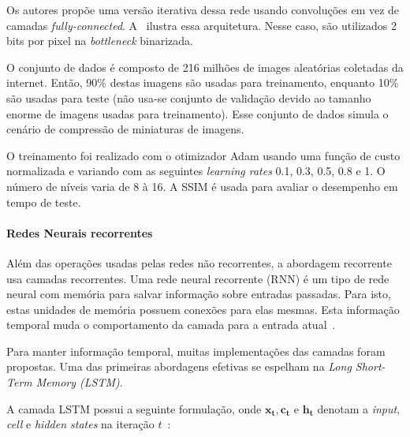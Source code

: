 Os autores propõe uma versão iterativa dessa rede usando convoluções em vez de camadas \textit{fully-connected}. A~ ilustra essa arquitetura. Nesse caso, são utilizados 2 bits por pixel na \textit{bottleneck} binarizada.


O conjunto de dados é composto de 216 milhões de images aleatórias coletadas da internet. Então, 90\% destas imagens são usadas para treinamento, enquanto 10\% são usadas para teste (não usa-se conjunto de validação devido ao tamanho enorme de imagens usadas para treinamento). Esse conjunto de dados simula o cenário de compressão de miniaturas de imagens.

O treinamento foi realizado com o otimizador Adam usando uma função de custo normalizada e variando com as seguintes \textit{learning rates} 0.1, 0.3, 0.5, 0.8 e 1. O número de níveis varia de 8 à 16. A \acrshort{SSIM} é usada para avaliar o desempenho em tempo de teste. 

\paragraph{Redes Neurais recorrentes\\}
Além das operações usadas pelas redes não recorrentes, a abordagem recorrente usa camadas recorrentes. Uma rede neural recorrente (\acrshort{RNN}) é um tipo de rede neural com memória para salvar informação sobre entradas passadas. Para isto, estas unidades de memória possuem conexões para elas mesmas. Esta informação temporal muda o comportamento da camada para a entrada atual~\cite{Survey_CSVT2019}.

Para manter informação temporal, muitas implementações das camadas foram propostas. Uma das primeiras abordagens efetivas se espelham na \textit{Long Short-Term Memory (\acrshort{LSTM})}.

A camada \acrshort{LSTM} possui a seguinte formulação, onde $\mathbf{x_t}, \mathbf{c_t} \textrm{ e } \mathbf{h_t}$ denotam a \textit{input}, \textit{cell} e \textit{hidden states} na iteração $t$~\cite{FullResolution2017Toderici}:

